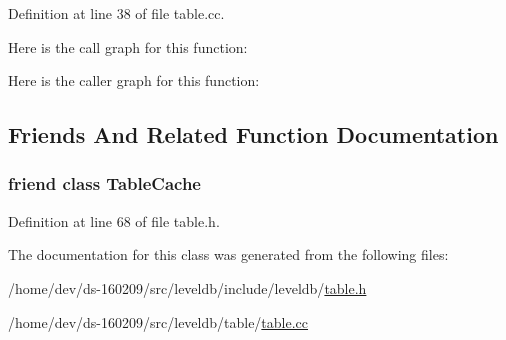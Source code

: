 Definition at line 38 of file table.\+cc.



Here is the call graph for this function\+:




Here is the caller graph for this function\+:




\subsection{Friends And Related Function Documentation}
\hypertarget{classleveldb_1_1_table_ae1e5f7bae4682672cfcc68d0add43199}{}
\subsubsection[{Table\+Cache}]{\setlength{\rightskip}{0pt plus 5cm}friend class {\bf Table\+Cache}\hspace{0.3cm}{\ttfamily [friend]}}\label{classleveldb_1_1_table_ae1e5f7bae4682672cfcc68d0add43199}


Definition at line 68 of file table.\+h.



The documentation for this class was generated from the following files\+:\begin{DoxyCompactItemize}
\item 
/home/dev/ds-\/160209/src/leveldb/include/leveldb/\hyperlink{table_8h}{table.\+h}\item 
/home/dev/ds-\/160209/src/leveldb/table/\hyperlink{table_8cc}{table.\+cc}\end{DoxyCompactItemize}
